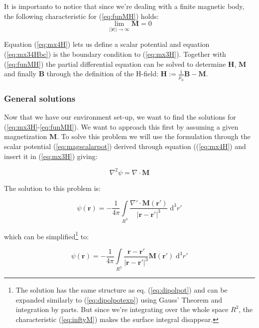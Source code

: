 It is importanto to notice that since we're dealing with a finite magnetic body, the following characteristic for (\ref{eq:funMH}) holds: 
\begin{equation}\label{eq:inftyM}
\lim_{||\textbf{r}||  \rightarrow \infty} \textbf{M} =0
\end{equation}

Equation (\ref{eq:mx4H}) lets us define a scalar potential and equation (\ref{eq:mx34Hbc}) is the boundary condition to (\ref{eq:mx3H}). Together with (\ref{eq:funMH}) the partial differential equation can be solved to determine $\textbf{H}$, $\textbf{M}$ and finally $\textbf{B}$ through the definition of the H-field: $\textbf{H} := \frac{1}{\mu_0}\textbf{B} - \textbf{M}$.

\subsubsection{General solutions}

Now that we have our environment set-up, we want to find the solutions for (\ref{eq:mx3H}-\ref{eq:funMH}). We want to approach this first by assuming a given magnetization $\textbf{M}$. To solve this problem we will use the formulation through the scalar potential (\ref{eq:magscalarpot}) derived through equation ((\ref{eq:mx4H}) and insert it in (\ref{eq:mx3H}) giving:

\begin{equation}
\nabla^2\psi = \nabla\cdot\textbf{M}
\end{equation}

The solution to this problem is:

\begin{equation}\label{eq:potmagM}
\psi(\textbf{r}) = -\frac{1}{4\pi}\int\limits_{R^3}\frac{\nabla'\cdot\textbf{M}(\textbf{r}')}{|\textbf{r}-\textbf{r}'|^3}\;\mathrm{d}^3r'
\end{equation}

which can be simplified\footnote{The solution has the same structure as eq. (\ref{eq:dipolpot}) and can be expanded similarly to (\ref{eq:dipolpotexp}) using Gauss' Theorem and integration by parts. But since we're integrating over the whole space $R^3$, the characteristic (\ref{eq:inftyM}) makes the surface integral disappear. } to:

\begin{equation}\label{eq:potmagMsimp}
\psi(\textbf{r}) = -\frac{1}{4\pi}\int\limits_{R^3}\frac{\textbf{r}-\textbf{r}'}{|\textbf{r}-\textbf{r}'|^3}\textbf{M}(\textbf{r}')\;\mathrm{d}^3r'
\end{equation}

